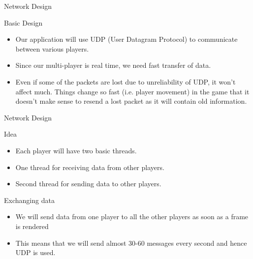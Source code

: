 \documentclass{beamer}
\begin{document}
\begin{frame}{Network Design}{}
	\begin{block}{Basic Design}
		\begin{itemize}
			\item Our application will use UDP (User Datagram Protocol) to communicate between various players.
			\item Since our multi-player is real time, we need fast transfer of data.
			\item Even if some of the packets are lost due to unreliability of UDP, it won't affect much. Things change so fast (i.e. player movement) in the game that it doesn't make sense to resend a lost packet as it will contain old information.
		\end{itemize}
	\end{block}
\end{frame}

\begin{frame}{Network Design}{}	
	\begin{block}{Idea}
		\begin{itemize}
			\item Each player will have two basic threads.
			\item One thread for receiving data from other players.
			\item Second thread for sending data to other players.
		\end{itemize}
	\end{block}

	\begin{block}{Exchanging data}
		\begin{itemize}
			\item We will send data from one player to all the other players as soon as a frame is rendered
			\item This means that we will send almost 30-60 messages every second and hence UDP is used.
		\end{itemize}
	\end{block}
\end{frame}
\end{document}
